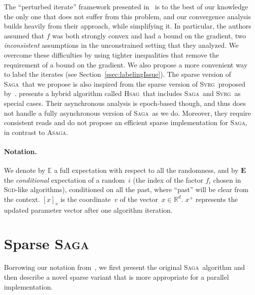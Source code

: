 \documentclass[twoside]{article}
\newcommand{\E}{\mathbb{E}}
\newcommand{\Econd}{\mathbf{E}}
\newcommand{\ASAGA}{\textsc{Asaga}}
\newcommand{\SAGA}{\textsc{Saga}}
\newcommand{\SVRG}{\textsc{Svrg}}
\newcommand{\SGD}{\textsc{Sgd}}
\newcommand{\HSAG}{\textsc{Hsag}}
\begin{document}
The ``perturbed iterate'' framework presented in~\citet{mania} is to the best of our knowledge the only one that does not suffer from this problem, and our convergence analysis builds heavily from their approach, while simplifying it.
In particular, the authors assumed that $f$ was both strongly convex and had a bound on the gradient, two \emph{inconsistent} assumptions in the unconstrained setting that they analyzed.
We overcome these difficulties by using tighter inequalities that remove the requirement of a bound on the gradient. We also propose a more convenient way to label the iterates (see Section~\ref{ssec:labelingIssue}).
The sparse version of \SAGA\ that we propose is also inspired from the sparse version of \SVRG\ proposed by~\citet{mania}. 
\citet{smola} presents a hybrid algorithm called \HSAG\ that includes \SAGA\ and \SVRG\ as special cases. 
Their asynchronous analysis is epoch-based though, and thus does not handle a fully asynchronous version of \SAGA\ as we do. 
Moreover, they require consistent reads and do not propose an efficient sparse implementation for \SAGA, in contrast to \ASAGA.  

\vspace{-2mm}
\paragraph{Notation.}  We denote by $\E$ a full expectation with respect to all the randomness, and by $\Econd$ the \emph{conditional} expectation of a random~$i$ (the index of the factor $f_i$ chosen in \SGD-like algorithms), conditioned on all the past, where ``past'' will be clear from the context. 
$[x]_v$ is the coordinate~$v$ of the vector~$x \in \mathbb{R}^d$.
$x^+$ represents the updated parameter vector after one algorithm iteration.

\vspace{-1mm}
\section{Sparse \SAGA}\label{scs:sparse_saga}
\vspace{-3mm}
Borrowing our notation from~\citet{qsaga}, we first present the original \SAGA\ algorithm and then describe a novel sparse variant that is more appropriate for a parallel implementation. 

\vspace{-2mm}
\end{document}
